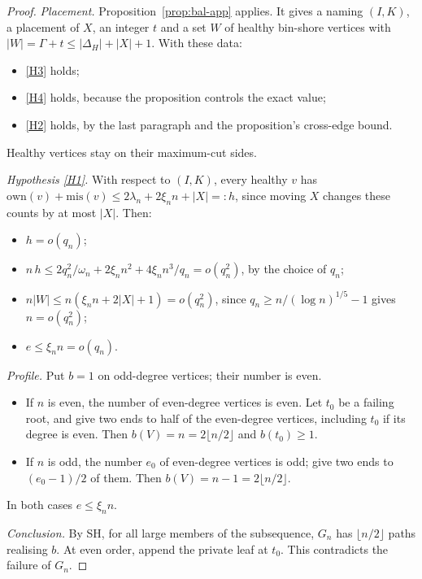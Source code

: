 \documentclass[11pt]{article}
\theoremstyle{definition}
\newcommand{\own}{\mathrm{own}}
\newcommand{\mis}{\mathrm{mis}}
\begin{document}
\begin{proof}
\emph{Placement.} Proposition~\ref{prop:bal-app} applies. It gives a naming $(I,K)$, a placement of $X$, an integer $t$ and a set $W$ of healthy bin-shore vertices with $|W|=\Gamma+t\le|\Delta_H|+|X|+1$. With these data:
\begin{itemize}[nosep]
\item \ref{H3} holds;
\item \ref{H4} holds, because the proposition controls the exact value;
\item \ref{H2} holds, by the last paragraph and the proposition's cross-edge bound.
\end{itemize}
Healthy vertices stay on their maximum-cut sides.

\emph{Hypothesis \ref{H1}.} With respect to $(I,K)$, every healthy $v$ has $\own(v)+\mis(v)\le2\lambda_n+2\xi_nn+|X|=:h$, since moving $X$ changes these counts by at most $|X|$. Then:
\begin{itemize}[nosep]
\item $h=o(q_n)$;
\item $n\,h\le2q_n^2/\omega_n+2\xi_nn^2+4\xi_nn^3/q_n=o(q_n^2)$, by the choice of $q_n$;
\item $n|W|\le n(\xi_nn+2|X|+1)=o(q_n^2)$, since $q_n\ge n/(\log n)^{1/5}-1$ gives $n=o(q_n^2)$;
\item $e\le\xi_nn=o(q_n)$.
\end{itemize}

\emph{Profile.} Put $b=1$ on odd-degree vertices; their number is even.
\begin{itemize}[nosep]
\item If $n$ is even, the number of even-degree vertices is even. Let $t_0$ be a failing root, and give two ends to half of the even-degree vertices, including $t_0$ if its degree is even. Then $b(V)=n=2\lfloor n/2\rfloor$ and $b(t_0)\ge1$.
\item If $n$ is odd, the number $e_0$ of even-degree vertices is odd; give two ends to $(e_0-1)/2$ of them. Then $b(V)=n-1=2\lfloor n/2\rfloor$.
\end{itemize}
In both cases $e\le\xi_nn$.

\emph{Conclusion.} By SH, for all large members of the subsequence, $G_n$ has $\lfloor n/2\rfloor$ paths realising $b$. At even order, append the private leaf at $t_0$. This contradicts the failure of $G_n$.
\end{proof}
\end{document}
